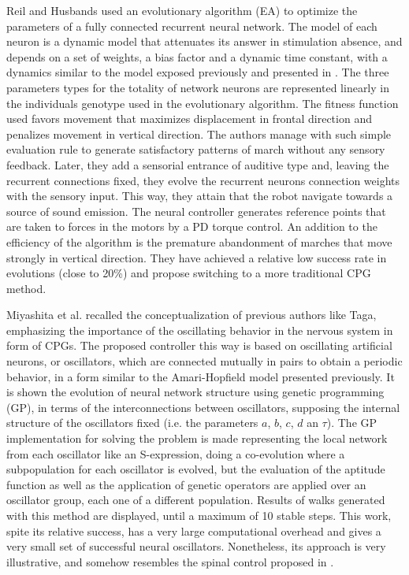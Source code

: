 Reil and Husbands \cite{Reil02Evolution} used an evolutionary algorithm (EA) to optimize the parameters of a fully connected recurrent neural network. The model of each neuron is a dynamic model that attenuates its answer in stimulation absence, and depends on a set of weights, a bias factor and a dynamic time constant, with a dynamics similar to the model exposed previously and presented in \cite{Cao98design}. The three parameters types for the totality of network neurons are represented linearly in the individuals genotype used in the evolutionary algorithm. The fitness function used favors movement that maximizes displacement in frontal direction and penalizes movement in vertical direction. The authors manage with such simple evaluation rule to generate satisfactory patterns of march without any sensory feedback. Later, they add a sensorial entrance of auditive type and, leaving the recurrent connections fixed, they evolve the recurrent neurons connection weights with the sensory input. This way, they attain that the robot navigate towards a source of sound emission. The neural controller generates reference points that are taken to forces in the motors by a PD torque control. An addition to the efficiency of the algorithm is the premature abandonment of marches that move strongly in vertical direction. They have achieved a relative low success rate in evolutions (close to 20\%) and propose switching to a more traditional CPG method.


Miyashita et al. \cite{Miyashita03Evolutionary} recalled the conceptualization of previous authors like Taga, emphasizing the importance of the oscillating behavior in the nervous system in form of CPGs. The proposed controller this way is based on oscillating artificial neurons, or oscillators, which are connected mutually in pairs to obtain a periodic behavior, in a form similar to the Amari-Hopfield model presented previously. It is shown the evolution of neural network structure using genetic programming (GP), in terms of the interconnections between oscillators, supposing the internal structure of the oscillators fixed (i.e. the parameters $a$, $b$, $c$, $d$ an $\tau$). The GP implementation for solving the problem is made representing the local network from each oscillator like an S-expression, doing a co-evolution where a subpopulation for each oscillator is evolved, but the evaluation of the aptitude function as well as the application of genetic operators are applied over an oscillator group, each one of a different population. Results of walks generated with this method are displayed, until a maximum of 10 stable steps. This work, spite its relative success, has a very large computational overhead and gives a very small set of successful neural oscillators. Nonetheless, its approach is very illustrative, and somehow resembles the spinal control proposed in \cite{Duysens02walking}.


